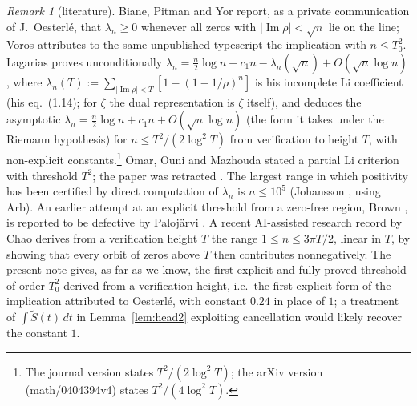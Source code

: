 \documentclass[11pt]{article}
\theoremstyle{remark}
\newtheorem{remark}[theorem]{Remark}
\renewcommand{\Im}{\operatorname{Im}}
\begin{document}
\begin{remark}[literature]
Biane, Pitman and Yor \cite[p.~441]{BPY01} report, as a private communication of J.~Oesterl\'e, that $\lambda_n\ge0$ whenever all zeros with $|\Im\rho|<\sqrt n$ lie on the line; Voros \cite{Vor17} attributes to the same unpublished typescript the implication with $n\le T_0^2$. Lagarias \cite[Thm.~1.1, eq.~(1.17), and the remark preceding it]{Lag07} proves unconditionally $\lambda_n=\tfrac n2\log n+c_1n-\lambda_n(\sqrt n)+O(\sqrt n\log n)$, where $\lambda_n(T):=\sum_{|\Im\rho|<T}[1-(1-1/\rho)^n]$ is his incomplete Li coefficient (his eq.~(1.14); for $\zeta$ the dual representation is $\zeta$ itself), and deduces the asymptotic $\lambda_n=\tfrac n2\log n+c_1n+O(\sqrt n\log n)$ (the form it takes under the Riemann hypothesis) for $n\le T^2/(2\log^2T)$ from verification to height $T$, with non-explicit constants.\footnote{The journal version states $T^2/(2\log^2 T)$; the arXiv version (math/0404394v4) states $T^2/(4\log^2T)$.} Omar, Ouni and Mazhouda \cite{OOM11} stated a partial Li criterion with threshold $T^2$; the paper was retracted \cite{OOMretr}. The largest range in which positivity has been certified by direct computation of $\lambda_n$ is $n\le10^5$ (Johansson \cite{Joh15}, using Arb). An earlier attempt at an explicit threshold from a zero-free region, Brown \cite[Thm.~2]{Bro05}, is reported to be defective by Paloj\"arvi \cite{Pal18}. A recent AI-assisted research record by Chao \cite{Cha26} derives from a verification height $T$ the range $1\le n\le3\pi T/2$, linear in $T$, by showing that every orbit of zeros above $T$ then contributes nonnegatively. The present note gives, as far as we know, the first explicit and fully proved threshold of order $T_0^2$ derived from a verification height, i.e.\ the first explicit form of the implication attributed to Oesterl\'e, with constant $0.24$ in place of $1$; a treatment of $\int\tilde S(t)\,dt$ in Lemma~\ref{lem:head2} exploiting cancellation would likely recover the constant $1$.
\end{remark}
\end{document}
